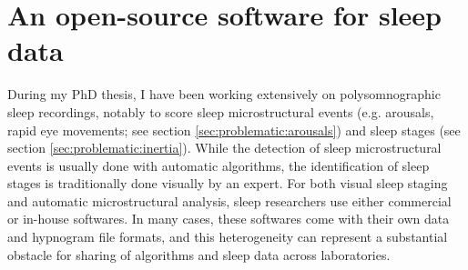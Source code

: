 \section{An open-source software for sleep data}
\label{sec:problematic:software}

During my PhD thesis, I have been working extensively on polysomnographic sleep recordings, notably to score sleep microstructural events (e.g. arousals, rapid eye movements; see section \ref{sec:problematic:arousals}) and sleep stages (see section \ref{sec:problematic:inertia}). While the detection of sleep microstructural events is usually done with automatic algorithms, the identification of sleep stages is traditionally done visually by an expert. For both visual sleep staging and automatic microstructural analysis, sleep researchers use either commercial or in-house softwares. In many cases, these softwares come with their own data and hypnogram file formats, and this heterogeneity can represent a substantial obstacle for sharing of algorithms and sleep data across laboratories.




